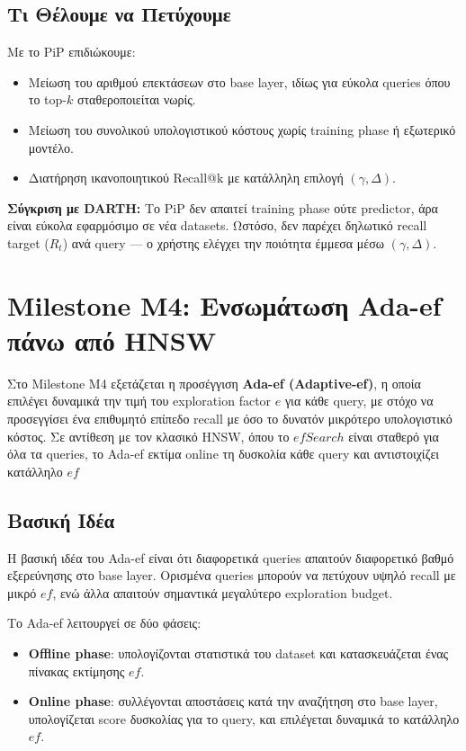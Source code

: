 \documentclass[12pt,a4paper]{article}
\begin{document}
\subsection{Τι Θέλουμε να Πετύχουμε}
Με το PiP επιδιώκουμε:
\begin{itemize}
    \item Μείωση του αριθμού επεκτάσεων στο base layer, ιδίως για εύκολα queries όπου το top-$k$ σταθεροποιείται νωρίς.
    \item Μείωση του συνολικού υπολογιστικού κόστους χωρίς training phase ή εξωτερικό μοντέλο.
    \item Διατήρηση ικανοποιητικού Recall@k με κατάλληλη επιλογή $(\gamma, \Delta)$.
\end{itemize}

\textbf{Σύγκριση με DARTH:} Το PiP δεν απαιτεί training phase ούτε predictor, άρα είναι εύκολα εφαρμόσιμο σε νέα datasets. Ωστόσο, δεν παρέχει δηλωτικό recall target ($R_t$) ανά query — ο χρήστης ελέγχει την ποιότητα έμμεσα μέσω $(\gamma, \Delta)$.

\section{Milestone M4: Ενσωμάτωση Ada-ef πάνω από HNSW}

Στο Milestone M4 εξετάζεται η προσέγγιση \textbf{Ada-ef (Adaptive-ef)}, η οποία επιλέγει δυναμικά την τιμή του exploration factor $e$ για κάθε query, με στόχο να προσεγγίσει ένα επιθυμητό επίπεδο recall με όσο το δυνατόν μικρότερο υπολογιστικό κόστος.
Σε αντίθεση με τον κλασικό HNSW, όπου το $efSearch$ είναι σταθερό για όλα τα queries, το Ada-ef εκτίμα online τη δυσκολία κάθε query και αντιστοιχίζει κατάλληλο $ef$
\subsection{Βασική Ιδέα}
Η βασική ιδέα του Ada-ef είναι ότι διαφορετικά queries απαιτούν διαφορετικό βαθμό εξερεύνησης στο base layer. Ορισμένα queries μπορούν να πετύχουν υψηλό recall με μικρό $ef$, ενώ άλλα απαιτούν σημαντικά μεγαλύτερο exploration budget.

Το Ada-ef λειτουργεί σε δύο φάσεις:
\begin{itemize}
    \item \textbf{Offline phase}: υπολογίζονται στατιστικά του dataset και κατασκευάζεται ένας πίνακας εκτίμησης $ef$.
    \item \textbf{Online phase}: συλλέγονται αποστάσεις κατά την αναζήτηση στο base layer, υπολογίζεται score δυσκολίας για το query, και επιλέγεται δυναμικά το κατάλληλο $ef$.
\end{itemize}
\end{document}
